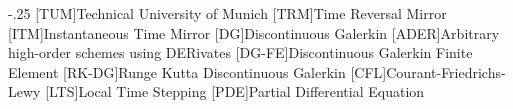 \documentclass[titlepage=firstiscover,headsepline,footsepline,footinclude=false,fontsize=11pt,paper=a4,listof=totoc,bibliography=totoc,BCOR=12mm,DIV=12]{scrbook} %
\begin{document}

\frontmatter{}




\tableofcontents{}

\mainmatter{}










\appendix{}


\begin{acronym}
	\itemsep-.25\baselineskip
	[TUM]{Technical University of Munich}
	[TRM]{Time Reversal Mirror}
	[ITM]{Instantaneous Time Mirror}
	[DG]{Discontinuous Galerkin}
	[ADER]{Arbitrary high-order schemes using DERivates}
	[DG-FE]{Discontinuous Galerkin Finite Element}
	[RK-DG]{Runge Kutta Discontinuous Galerkin}
	[CFL]{Courant-Friedrichs-Lewy}
	[LTS]{Local Time Stepping}
	[PDE]{Partial Differential Equation}
\end{acronym}

\listoffigures{}
\listoftables{}
\printbibliography{}
\end{document}
